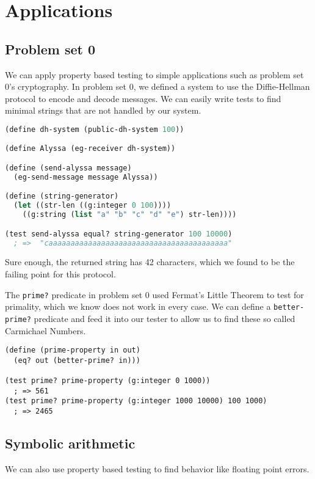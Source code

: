 
\section{Applications}

\subsection{Problem set 0}

We can apply property based testing to simple applications such as problem set 0's cryptography. In problem set 0, we defined a system to use the Diffie-Hellman protocol to encode and decode messages. We can easily write tests to find minimal strings that are not handled by our system.

\begin{lstlisting}[language=lisp]
(define dh-system (public-dh-system 100))

(define Alyssa (eg-receiver dh-system))

(define (send-alyssa message)
  (eg-send-message message Alyssa))

(define (string-generator)
  (let ((str-len ((g:integer 0 100))))
    ((g:string (list "a" "b" "c" "d" "e") str-len))))

(test send-alyssa equal? string-generator 100 10000)
  ; =>  "caaaaaaaaaaaaaaaaaaaaaaaaaaaaaaaaaaaaaaaaa"
\end{lstlisting}

Sure enough, the returned string has 42 characters, which we found to be the failing point for this protocol.

The \verb|prime?| predicate in problem set 0 used Fermat's Little Theorem to test for primality, which we know does not work in every case. We can define a \verb|better-prime?| predicate and feed it into our tester to allow us to find these so called Carmichael Numbers.
\begin{lstlisting}
(define (prime-property in out)
  (eq? out (better-prime? in)))

(test prime? prime-property (g:integer 0 1000))
  ; => 561
(test prime? prime-property (g:integer 1000 10000) 100 1000)
  ; => 2465
\end{lstlisting}

\subsection{Symbolic arithmetic}

We can also use property based testing to find behavior like floating point errors.


